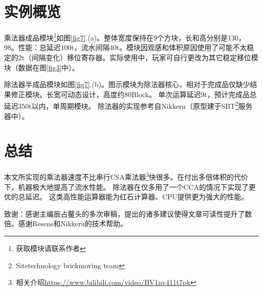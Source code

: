 \documentclass[UTF8,12pt,punct=kaiming,fontset=none]{ctexart}
\begin{document}
\section{实例概览}

乘法器成品模块\footnote{获取模块请联系作者}如图\ref{fig7}.(a)。整体宽度保持在9个方块，长和高分别是130，98。性能：总延迟100t，流水间隔40t。模块因观感和体积原因使用了可能不太稳定的2t（间隔变化）移位寄存器。实际使用中，玩家可自行更改为其它稳定移位模块（数据在图\ref{fig3}中）。

除法器半成品模块如图\ref{fig7}.(b)。图示模块为除法器核心，相对于完成品仅缺少结果修正模块。长宽可动态设计，高度约80Block。
单次运算延迟9t，预计完成品总延迟350t以内，单周期模块。
除法器的实现参考自Nikkeru（原型建于SBT\footnote{Sitetechnology brickmoving team}服务器中）。

\section{总结}
本文所实现的乘法器速度不比串行CSA乘法器\footnote{相关介绍\url{https://www.bilibili.com/video/BV1nv411t7pk}}快很多。在付出多倍体积的代价下，机器极大地提高了流水性能。
除法器在仅多用了一个CCA的情况下实现了更优的总延迟。
这类高性能运算器能为红石计算器、CPU提供更为强大的性能。
\newline

致谢：感谢主编辰占鳌头的多次审稿，提出的诸多建议使得文章可读性提升了数倍。感谢Resens和Nikkeru的技术帮助。



\end{document}
